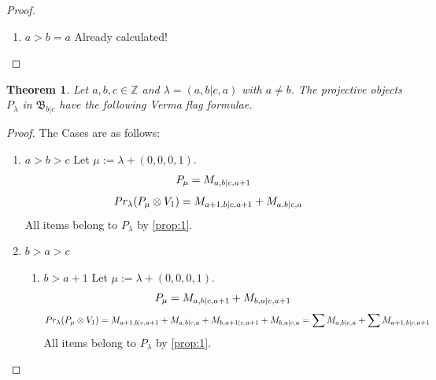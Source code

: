 \documentclass[12pt,a4paper]{article}
\newtheorem{theorem}{Theorem}[section]
\begin{document}
\begin{proof}
\begin{enumerate}
\item $a>b=a$ Already calculated!

\end{enumerate}
\end{proof}



\begin{theorem}
  Let $a,b,c \in \mathbb{Z}$ and $\lambda = (a,b|c,a)$ with $a \neq b$. The projective objects $P_{\lambda}$ in $\mathfrak{B}_{b|c}$ have the following Verma flag formulae.
\end{theorem}
\begin{proof} The Cases are as follows:\par
\begin{enumerate}

\item $a>b>c$
        Let $\mu:=\lambda + (0,0,0,1) $. 
\begin{equation}\notag
  \begin{aligned}
      P_{\mu} = M_{a,b|c,a+1}
  \end{aligned}
\end{equation}
\begin{equation}\notag
  \begin{aligned}
  Pr_{\lambda}(P_\mu \otimes V_1) &=
M_{a+1,b|c,a+1}
+M_{a,b|c,a}
  \end{aligned}
\end{equation}
All items belong to $P_\lambda$ by \cref{prop:1}.

\item $b>a>c$
  \begin{enumerate}
    \item $b>a+1$
        Let $\mu:=\lambda + (0,0,0,1) $. 
\begin{equation}\notag
  \begin{aligned}
      P_{\mu} =
M_{a,b|c,a+1}
+M_{b,a|c,a+1}
  \end{aligned}
\end{equation}
\begin{equation}\notag
  \begin{aligned}
  Pr_{\lambda}(P_\mu \otimes V_1) &=
M_{a+1,b|c,a+1}
+M_{a,b|c,a}
+M_{b,a+1|c,a+1}
+M_{b,a|c,a}
                                  =
\sum M_{a,b|c,a}
+\sum M_{a+1,b|c,a+1}
  \end{aligned}
\end{equation}
All items belong to $P_\lambda$ by \cref{prop:1}.
    

\end{enumerate}
\end{enumerate}
\end{proof}
\end{document}
